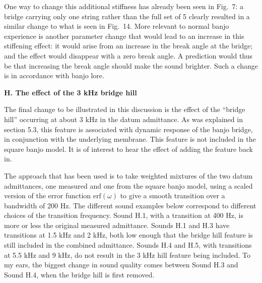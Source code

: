 



  One way to change this additional stiffness has already been seen in Fig.\ 7: 
  a bridge carrying only one string rather than the full set of 5 clearly 
  resulted in a similar change to what is seen in Fig.\ 14. More relevant to 
  normal banjo experience is another parameter change that would lead to an 
  increase in this stiffening effect: it would arise from an increase in the 
  break angle at the bridge; and the effect would disappear with a zero break 
  angle. A prediction would thus be that increasing the break angle should make 
  the sound brighter. Such a change is in accordance with banjo lore. 

  \textbf{H. The effect of the 3 kHz bridge hill} 

  The final change to be illustrated in this discussion is the effect of the 
  ``bridge hill'' occurring at about 3 kHz in the datum admittance. As was 
  explained in section 5.3, this feature is associated with dynamic response of 
  the banjo bridge, in conjunction with the underlying membrane. This feature 
  is not included in the square banjo model. It is of interest to hear the 
  effect of adding the feature back in. 

  The approach that has been used is to take weighted mixtures of the two datum 
  admittances, one measured and one from the square banjo model, using a scaled 
  version of the error function $\mathrm{erf}(\omega)$ to give a smooth 
  transition over a bandwidth of 200 Hz. The different sound examples below 
  correspond to different choices of the transition frequency. Sound H.1, with 
  a transition at 400 Hz, is more or less the original measured admittance. 
  Sounds H.1 and H.3 have transitions at 1.5 kHz and 2 kHz, both low enough 
  that the bridge hill feature is still included in the combined admittance. 
  Sounds H.4 and H.5, with transitions at 5.5 kHz and 9 kHz, do not result in 
  the 3 kHz hill feature being included. To my ears, the biggest change in 
  sound quality comes between Sound H.3 and Sound H.4, when the bridge hill is 
  first removed. 

